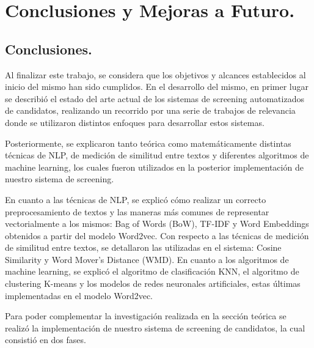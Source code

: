 \documentclass[12pt,a4paper]{article}
\begin{document}
\begin{sloppypar}
\cleardoublepage

\section{Conclusiones y Mejoras a Futuro.}

\subsection{Conclusiones.}

Al finalizar este trabajo, se considera que los objetivos y alcances establecidos al inicio del mismo han sido cumplidos. En el desarrollo del mismo, en primer lugar se describió el estado del arte actual de los sistemas de screening automatizados de candidatos, realizando un recorrido por una serie de trabajos de relevancia donde se utilizaron distintos enfoques para desarrollar estos sistemas.

Posteriormente, se explicaron tanto teórica como matemáticamente distintas técnicas de NLP, de medición de similitud entre textos y diferentes algoritmos de machine learning, los cuales fueron utilizados en la posterior implementación de nuestro sistema de screening. 

En cuanto a las técnicas de NLP, se explicó cómo realizar un correcto preprocesamiento de textos y las maneras más comunes de representar vectorialmente a los mismos: Bag of Words (BoW), TF-IDF y Word Embeddings obtenidos a partir del modelo Word2vec. Con respecto a las técnicas de medición de similitud entre textos, se detallaron las utilizadas en el sistema: Cosine Similarity y Word Mover’s Distance (WMD). En cuanto a los algoritmos de machine learning, se explicó el algoritmo de clasificación KNN, el algoritmo de clustering K-means y los modelos de redes neuronales artificiales, estas últimas implementadas en el modelo Word2vec.

Para poder complementar la investigación realizada en la sección teórica se realizó la implementación de nuestro sistema de screening de candidatos, la cual consistió en dos fases. 


\end{sloppypar}
\end{document}
